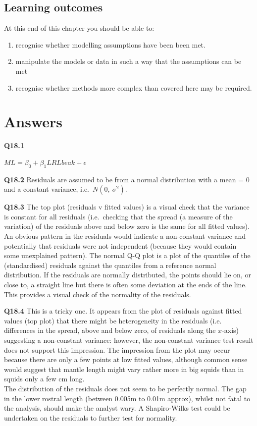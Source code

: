 \documentclass[
  oneside]{krantz}
\providecommand{\tightlist}{%
  \setlength{\itemsep}{0pt}\setlength{\parskip}{0pt}}
\begin{document}
\hypertarget{learning-outcomes-9}{%
\subsection{Learning outcomes}\label{learning-outcomes-9}}

At this end of this chapter you should be able to:

\begin{enumerate}
\def\labelenumi{\arabic{enumi}.}
\tightlist
\item
  recognise whether modelling assumptions have been been met.
\item
  manipulate the models or data in such a way that the assumptions can be met
\item
  recognise whether methods more complex than covered here may be required.
\end{enumerate}

\hypertarget{ANSdiag}{%
\section{Answers}\label{ANSdiag}}

\textbf{Q18.1}

\(ML= \beta_0+\beta_1LRLbeak+ \epsilon\)

\textbf{Q18.2} Residuals are assumed to be from a normal distribution with a mean = 0 and a constant variance, i.e.~\(N(0,\ {\sigma{}}^2)\).

\textbf{Q18.3} The top plot (residuals v fitted values) is a visual check that the variance is
constant for all residuals (i.e.~checking that the spread (a measure of the
variation) of the residuals above and below zero is the same for all fitted
values). An obvious pattern in the residuals would indicate a non-constant
variance and potentially that residuals were not independent (because they would
contain some unexplained pattern).
The normal Q-Q plot is a plot of the quantiles of the (standardised) residuals
against the quantiles from a reference normal distribution. If the residuals are
normally distributed, the points should lie on, or close to, a straight line but
there is often some deviation at the ends of the line. This provides a visual
check of the normality of the residuals.

\textbf{Q18.4} This is a tricky one. It appears from the plot of residuals against fitted
values (top plot) that there might be heterogeneity in the residuals (i.e.
differences in the spread, above and below zero, of residuals along the
\(x\)-axis) suggesting a non-constant variance: however, the non-constant
variance test result does not support this impression. The impression from the
plot may occur because there are only a few points at low fitted values, although
common sense would suggest that mantle length might vary rather more in big
squids than in squids only a few cm long.\\
The distribution of the residuals does not seem to be perfectly normal. The gap
in the lower rostral length (between 0.005m to 0.01m approx), whilst not fatal to
the analysis, should make the analyst wary. A Shapiro-Wilks test could be
undertaken on the residuals to further test for normality.
\end{document}
